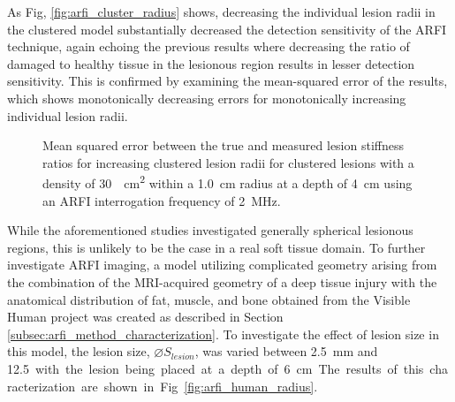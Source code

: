 			As Fig, \ref{fig:arfi_cluster_radius} shows, decreasing the individual lesion radii in the clustered model substantially decreased the detection sensitivity of the ARFI technique, again echoing the previous results where decreasing the ratio of damaged to healthy tissue in the lesionous region results in lesser detection sensitivity. This is confirmed by examining the mean-squared error of the results, which shows monotonically decreasing errors for monotonically increasing individual lesion radii.

			\begin{figure}[!htb]
				\centering
				\caption[ARFI imaging-acquired lesion stiffness mean squared error related to small lesion cluster density]{Mean squared error between the true and measured lesion stiffness ratios for increasing clustered lesion radii for clustered lesions with a density of \SI{30}{\per\cm\squared} within a \SI{1.0}{cm} radius at a depth of \SI{4}{\cm} using an ARFI interrogation frequency of \SI{2}{\MHz}.}
				\label{fig:arfi_cluster_radius_mse}
			\end{figure}

			While the aforementioned studies investigated generally spherical lesionous regions, this is unlikely to be the case in a real soft tissue domain. To further investigate ARFI imaging, a model utilizing complicated geometry arising from the combination of the MRI-acquired geometry of a deep tissue injury with the anatomical distribution of fat, muscle, and bone obtained from the Visible Human project \cite{visiblehuman} was created as described in Section \ref{subsec:arfi_method_characterization}. To investigate the effect of lesion size in this model, the lesion size, $\diameter S_{lesion}$, was varied between \SI{2.5}{\mm} and \SI{12.5} with the lesion being placed at a depth of \SI{6}{\cm}. The results of this characterization are shown in Fig. \ref{fig:arfi_human_radius}.

